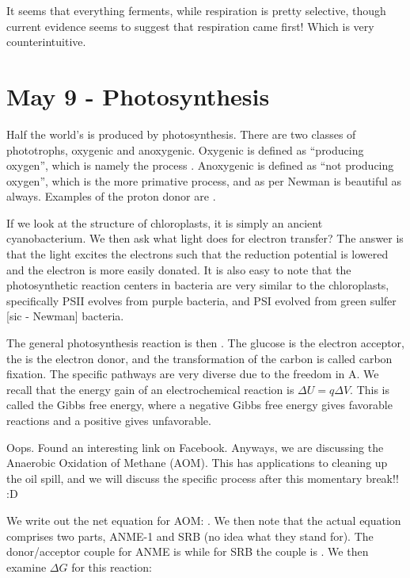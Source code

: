 \documentclass[12pt]{article}
\begin{document}
It seems that everything ferments, while respiration is pretty selective, though current evidence seems to suggest that respiration came first! Which is very counterintuitive.

\section*{May 9 - Photosynthesis}

Half the world's  is produced by photosynthesis. There are two classes of phototrophs, oxygenic and anoxygenic. Oxygenic is defined as ``producing oxygen'', which is namely the process . Anoxygenic is defined as ``not producing oxygen'', which is the more primative process, and as per Newman is beautiful as always. Examples of the proton donor are .

If we look at the structure of chloroplasts, it is simply an ancient cyanobacterium. We then ask what light does for electron transfer? The answer is that the light excites the electrons such that the reduction potential is lowered and the electron is more easily donated. It is also easy to note that the photosynthetic reaction centers in bacteria are very similar to the chloroplasts, specifically PSII evolves from purple bacteria, and PSI evolved from green sulfer [sic - Newman] bacteria.  

The general photosynthesis reaction is then . The  glucose is the electron acceptor, the  is the electron donor, and the transformation of the carbon is called carbon fixation. The specific pathways are very diverse due to the freedom in A. We recall that the energy gain of an electrochemical reaction is $\Delta U = q\Delta V$. This is called the Gibbs free energy, where a negative Gibbs free energy gives favorable reactions and a positive gives unfavorable. 

Oops. Found an interesting link on Facebook. Anyways, we are discussing the Anaerobic Oxidation of Methane (AOM). This has applications to cleaning up the oil spill, and we will discuss the specific process after this momentary break!! :D

We write out the net equation for AOM: . We then note that the actual equation comprises two parts, ANME-1 and SRB (no idea what they stand for). The donor/acceptor couple for ANME is  while for SRB the couple is . We then examine $\Delta G$ for this reaction:
\end{document}
